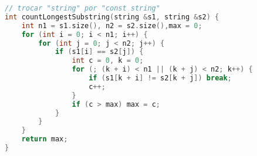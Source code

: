 \begin{lstlisting}[language=C++]
// trocar "string" por "const string"
int countLongestSubstring(string &s1, string &s2) {
    int n1 = s1.size(), n2 = s2.size(),max = 0;
    for (int i = 0; i < n1; i++) {
        for (int j = 0; j < n2; j++) {
            if (s1[i] == s2[j]) {
                int c = 0, k = 0;
                for (; (k + i) < n1 || (k + j) < n2; k++) {
                    if (s1[k + i] != s2[k + j]) break;
                    c++;
                }
                if (c > max) max = c;
            }
        }
    }
    return max;
}
\end{lstlisting}